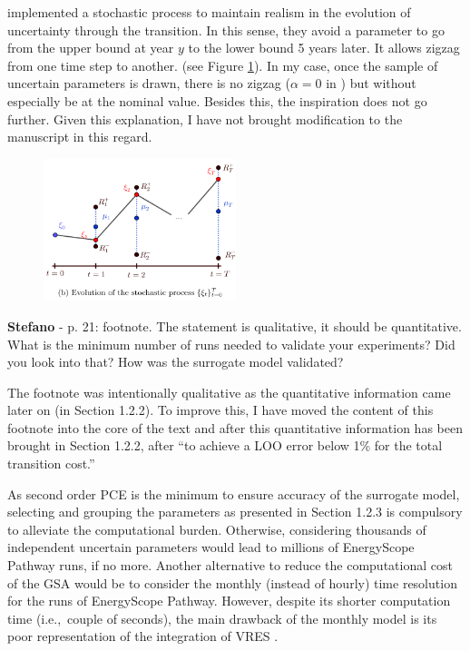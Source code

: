\documentclass[12pt,a4paper]{article}
\def\ie{i.e.,\ }
\begin{document}
\noindent \citet{guevara2022modeling} implemented a stochastic process to maintain realism in the evolution of uncertainty through the transition. In this sense, they avoid a parameter to go from the upper bound at year $y$ to the lower bound 5 years later. It allows zigzag from one time step to another. (see Figure \ref{fig:Guevara}). In my case, once the sample of uncertain parameters is drawn, there is no zigzag ($\alpha=0$ in \cite{guevara2022modeling}) but without especially be at the nominal value. Besides this, the inspiration does not go further. Given this explanation, I have not brought modification to the manuscript in this regard.

\begin{figure}[htbp!]
\centering
\includegraphics[width=0.5\textwidth]{Guevara.png}
\label{fig:Guevara}
\end{figure}

\begin{mdframed}[style=comment] %
{\color{orange} \textbf{Stefano}} - p. 21: footnote. The statement is qualitative, it should be quantitative. What is the minimum number of runs needed to validate your experiments? Did you look into that? How was the surrogate model validated?
\end{mdframed}

\noindent The footnote was intentionally qualitative as the quantitative information came later on (in Section 1.2.2). To improve this, I have moved the content of this footnote into the core of the text and after this quantitative information has been brought {\color{blue}in Section 1.2.2, after ``to achieve a LOO error below 1\% for the total transition cost.''}

\begin{mdframed}[style=manuscript] %
As second order PCE is the minimum to ensure accuracy of the surrogate model, selecting and grouping the parameters as presented in Section 1.2.3 is compulsory to alleviate the computational burden. Otherwise, considering thousands of independent uncertain parameters would lead to millions of EnergyScope Pathway runs, if no more. Another alternative to reduce the computational cost of the GSA would be to consider the monthly (instead of hourly) time resolution for the runs of EnergyScope Pathway. However, despite its shorter computation time (\ie couple of seconds), the main drawback of the monthly model is its poor representation of the integration of VRES \cite{limpens2024pathway}. 
\end{mdframed}
\end{document}
